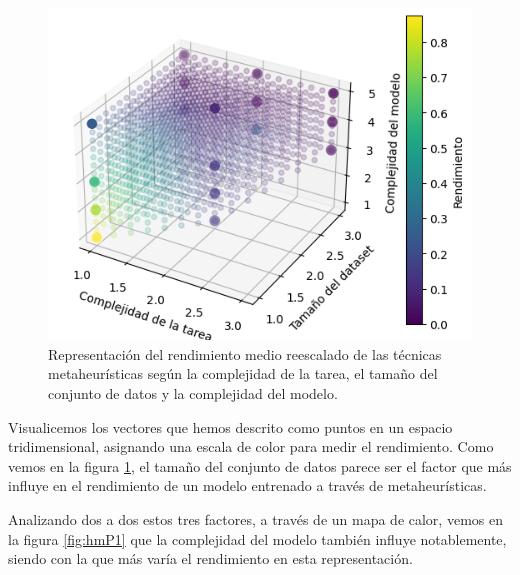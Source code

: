 \begin{figure}
    \centering
    \includegraphics[width=0.75\linewidth]{Plantilla_TFG_latex//imagenes//Inf//Resultados/P3/3d.png}
    \caption{Representación del rendimiento medio reescalado de las técnicas metaheurísticas según la complejidad de la tarea, el tamaño del conjunto de datos y la complejidad del modelo.}
    \label{fig:3dP1}
\end{figure}

Visualicemos los vectores que hemos descrito como puntos en un espacio tridimensional, asignando una escala de color para medir el rendimiento. Como vemos en la figura \ref{fig:3dP1}, el tamaño del conjunto de datos parece ser el factor que más influye en el rendimiento de un modelo entrenado a través de metaheurísticas. 



Analizando dos a dos estos tres factores, a través de un mapa de calor, vemos en la figura \ref{fig:hmP1} que la complejidad del modelo también influye notablemente, siendo con la que más varía el rendimiento en esta representación.

